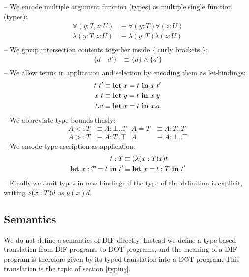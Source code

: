 \noindent -- We encode multiple argument function (types) as multiple single
function (types):
\begin{align*}
    \forall(y: T, z: U) &\equiv \forall(y: T)\forall(z: U) \\
    \lambda(y: T, z: U) &\equiv \lambda(y: T)\lambda(z: U) \\
\end{align*}
\noindent -- We group intersection contents together inside $\{$ curly brackets
$\}$:
\begin{align*}
    \{d \quad d'\} &\equiv \{d\} \wedge \{d'\} \\
\end{align*}
\noindent -- We allow terms in application and selection by encoding them as
let-bindings:
\begin{align*}
    t\ t' &\equiv \textbf{let}\ x = t\ \textbf{in}\ x\ t' \\
    x\ t &\equiv \textbf{let}\ y = t\ \textbf{in}\ x\ y \\
    t.a &\equiv \textbf{let}\ x = t\ \textbf{in}\ x.a
\end{align*}
\noindent -- We abbreviate type bounds thusly:
\begin{align*}
    A <: T &\equiv A: \bot..T & A = T &\equiv A: T..T \\
    A >: T &\equiv A: T..\top & A &\equiv A: \bot..\top
\end{align*}
\noindent -- We encode type ascription as application:
\begin{align*}
    t: T &\equiv (\lambda(x:T)x)t \\
    \textbf{let}\ x: T = t\ \textbf{in}\ t' &\equiv \textbf{let}\ x = t: T\ \textbf{in}\ t'
\end{align*}
\noindent -- Finally we omit types in new-bindings if the type of the definition
is explicit, writing $\nu(x:T)d$ as $\nu(x)d$.

\subsection{Semantics}
We do not define a semantics of DIF directly. Instead we define a type-based
translation from DIF programs to DOT programs, and the meaning of a DIF program
is therefore given by its typed translation into a DOT program. This
translation is the topic of section \ref{typing}.
